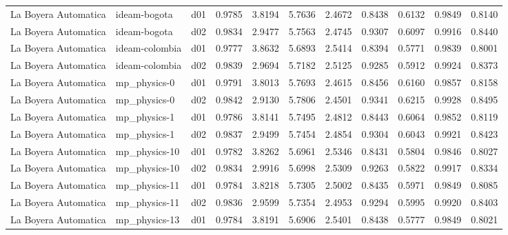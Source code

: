 \begin{longtable}{lllrrrrrrrr}
 La Boyera Automatica  &          ideam-bogota &     d01 &   0.9785 &   3.8194 &   5.7636 &       2.4672 &        0.8438 &       0.6132 &           0.9849 &  0.8140 \\
 La Boyera Automatica  &          ideam-bogota &     d02 &   0.9834 &   2.9477 &   5.7563 &       2.4745 &        0.9307 &       0.6097 &           0.9916 &  0.8440 \\
 La Boyera Automatica  &        ideam-colombia &     d01 &   0.9777 &   3.8632 &   5.6893 &       2.5414 &        0.8394 &       0.5771 &           0.9839 &  0.8001 \\
 La Boyera Automatica  &        ideam-colombia &     d02 &   0.9839 &   2.9694 &   5.7182 &       2.5125 &        0.9285 &       0.5912 &           0.9924 &  0.8373 \\
 La Boyera Automatica  &          mp\_physics-0 &     d01 &   0.9791 &   3.8013 &   5.7693 &       2.4615 &        0.8456 &       0.6160 &           0.9857 &  0.8158 \\
 La Boyera Automatica  &          mp\_physics-0 &     d02 &   0.9842 &   2.9130 &   5.7806 &       2.4501 &        0.9341 &       0.6215 &           0.9928 &  0.8495 \\
 La Boyera Automatica  &          mp\_physics-1 &     d01 &   0.9786 &   3.8141 &   5.7495 &       2.4812 &        0.8443 &       0.6064 &           0.9852 &  0.8119 \\
 La Boyera Automatica  &          mp\_physics-1 &     d02 &   0.9837 &   2.9499 &   5.7454 &       2.4854 &        0.9304 &       0.6043 &           0.9921 &  0.8423 \\
 La Boyera Automatica  &         mp\_physics-10 &     d01 &   0.9782 &   3.8262 &   5.6961 &       2.5346 &        0.8431 &       0.5804 &           0.9846 &  0.8027 \\
 La Boyera Automatica  &         mp\_physics-10 &     d02 &   0.9834 &   2.9916 &   5.6998 &       2.5309 &        0.9263 &       0.5822 &           0.9917 &  0.8334 \\
 La Boyera Automatica  &         mp\_physics-11 &     d01 &   0.9784 &   3.8218 &   5.7305 &       2.5002 &        0.8435 &       0.5971 &           0.9849 &  0.8085 \\
 La Boyera Automatica  &         mp\_physics-11 &     d02 &   0.9836 &   2.9599 &   5.7354 &       2.4953 &        0.9294 &       0.5995 &           0.9920 &  0.8403 \\
 La Boyera Automatica  &         mp\_physics-13 &     d01 &   0.9784 &   3.8191 &   5.6906 &       2.5401 &        0.8438 &       0.5777 &           0.9849 &  0.8021 \\

\end{longtable}
